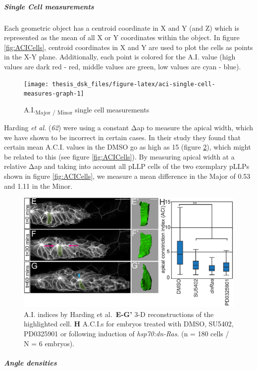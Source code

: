 \documentclass[11pt,singlespacinge,twoside]{reedthesis} %
\theoremstyle{definition}
\theoremstyle{definition}
\theoremstyle{definition}
\theoremstyle{remark}
\begin{document}
\hypertarget{ACI-singlecell}{%
\subparagraph{Single Cell measurements}\label{ACI-singlecell}}

Each geometric object has a centroid coordinate in X and Y (and Z) which is represented as the mean of all X or Y coordinates within the object. In figure \ref{fig:ACICells}, centroid coordinates in X and Y are used to plot the cells as points in the X-Y plane. Additionally, each point is colored for the A.I. value (high values are dark red - red, middle values are green, low values are cyan - blue).


\begin{figure}[H]

{\centering \texttt{[image: thesis\_dsk\_files/figure-latex/aci-single-cell-measures-graph-1]} 

}

\caption{A.I.\textsubscript{Major / Minor} single cell measurements}\label{fig:aci-single-cell-measures-graph}
\end{figure}
Harding \emph{et al.} (\emph{62}) were using a constant \(\mathrm{\Delta}\)ap to measure the apical width, which we have shown to be incorrect in certain cases. In their study they found that certain mean A.C.I. values in the DMSO go as high as 15 (figure \ref{fig:HardingACI}), which might be related to this (see figure \ref{fig:ACICells}). By measuring apical width at a relative \(\mathrm{\Delta}\)ap and taking into account all pLLP cells of the two exemplary pLLPs shown in figure \ref{fig:ACICells}, we measure a mean difference in the Major of 0.53 and 1.11 in the Minor.


\begin{figure}[H]

{\centering \includegraphics[width=0.6\linewidth]{figures/materials/models/harding} 

}

\caption[A.I. indices by Harding et al.]{A.I. indices by Harding et al.~\textbf{E-G'} 3-D reconstructions of the highlighted cell. \textbf{H} A.C.I.s for embryos treated with DMSO, SU5402, PD0325901 or following induction of \emph{hsp70:dn-Ras}. (n = 180 cells / N = 6 embryos).}\label{fig:HardingACI}
\end{figure}
\hypertarget{ACI-Angledens}{%
\subparagraph{Angle densities}\label{ACI-Angledens}}
\end{document}
